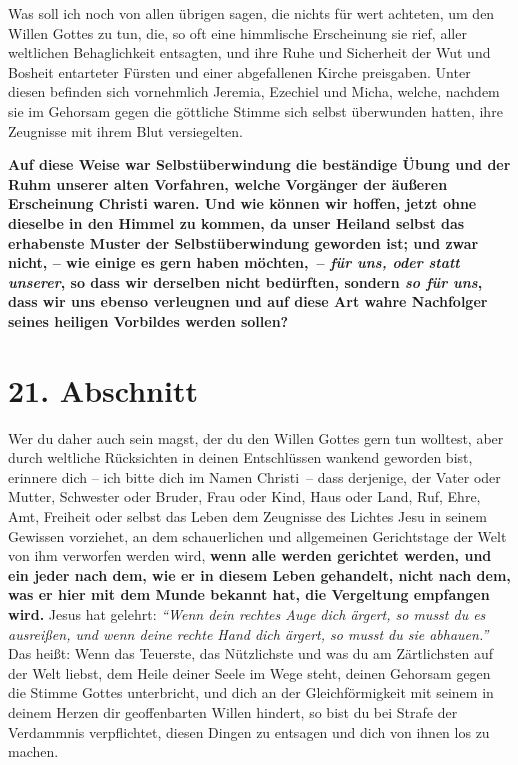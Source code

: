 Was soll ich noch von allen übrigen sagen, die nichts für wert achteten, um den
Willen Gottes zu tun, die, so oft eine himmlische Erscheinung sie rief, aller
weltlichen Behaglichkeit entsagten, und ihre Ruhe und Sicherheit der Wut und
Bosheit entarteter Fürsten und einer abgefallenen Kirche
preisgaben. Unter
diesen befinden sich vornehmlich Jeremia, Ezechiel
 und Micha, welche, nachdem
sie im Gehorsam gegen die göttliche Stimme sich selbst
überwunden hatten, ihre Zeugnisse
mit ihrem Blut versiegelten.

\medskip

\label{ref:04_20_opfertod}
 \textbf{Auf diese Weise war
Selbstüberwindung
die beständige Übung und der Ruhm
unserer alten Vorfahren, welche Vorgänger der äußeren Erscheinung Christi waren.
Und wie können wir hoffen, jetzt ohne dieselbe in den Himmel
 zu kommen, da
unser Heiland selbst das erhabenste Muster der
Selbstüberwindung geworden ist;
und zwar nicht, -- wie einige es gern haben möchten,~-- \textit{für uns, oder
statt
unserer}, so dass wir derselben nicht bedürften, sondern \textit{so für uns},
dass
wir uns ebenso verleugnen und auf diese Art wahre Nachfolger seines heiligen
Vorbildes werden sollen?}

\section{21. Abschnitt} \label{kap4_ab21}

Wer du daher auch sein magst, der du den Willen Gottes gern tun wolltest, aber
durch weltliche Rücksichten in deinen Entschlüssen wankend geworden bist,
erinnere dich -- ich bitte dich im Namen Christi~-- dass derjenige, der Vater
oder
Mutter, Schwester oder Bruder, Frau oder Kind, Haus oder Land, Ruf, Ehre, Amt,
Freiheit oder selbst das Leben dem Zeugnisse des Lichtes Jesu
in seinem
Gewissen vorziehet, an dem schauerlichen und allgemeinen Gerichtstage
 der Welt \label{ref:04_21_gericht}
von ihm verworfen werden wird, \textbf{wenn alle werden gerichtet werden, und
ein jeder
nach dem, wie er in diesem Leben gehandelt, nicht nach dem, was er hier mit dem
Munde bekannt hat, die Vergeltung empfangen wird.} Jesus hat
gelehrt:
\textit{"`Wenn
dein rechtes Auge dich ärgert, so musst du es ausreißen, und wenn deine rechte
Hand dich ärgert, so musst du sie abhauen."'}
Das heißt:
Wenn das Teuerste, das Nützlichste und was du am Zärtlichsten auf der Welt
liebst, dem Heile deiner Seele im Wege steht, deinen Gehorsam gegen die Stimme
Gottes unterbricht, und dich an der Gleichförmigkeit mit seinem in deinem Herzen
dir geoffenbarten Willen hindert, so bist du bei Strafe der Verdammnis
verpflichtet, diesen Dingen zu entsagen und dich von ihnen los zu machen.


